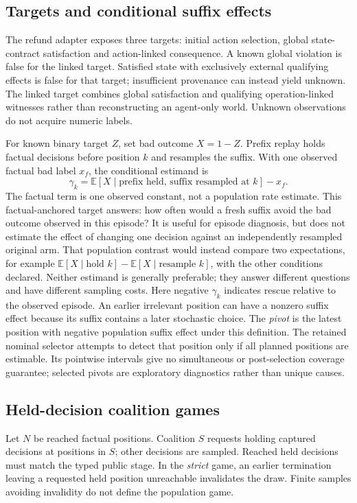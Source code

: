 \documentclass[conference]{IEEEtran}
\begin{document}
\subsection{Targets and conditional suffix effects}
The refund adapter exposes three targets: initial action selection, global
state-contract satisfaction and action-linked consequence. A known global
violation is false for the linked target. Satisfied state with exclusively
external qualifying effects is false for that target; insufficient provenance
can instead yield unknown. The linked target combines global satisfaction and
qualifying operation-linked witnesses rather than reconstructing an agent-only
world. Unknown observations do not acquire numeric labels.

For known binary target $Z$, set bad outcome $X=1-Z$. Prefix replay holds
factual decisions before position $k$ and resamples the suffix. With one
observed factual bad label $x_f$, the conditional estimand is
\begin{equation}
\gamma_k = \mathbb{E}[X\mid \text{prefix held, suffix resampled at }k]-x_f.
\end{equation}
The factual term is one observed constant, not a population rate estimate.
This factual-anchored target answers: how often would a fresh suffix avoid the
bad outcome observed in this episode? It is useful for episode diagnosis, but
does not estimate the effect of changing one decision against an independently
resampled original arm. That population contrast would instead compare two
expectations, for example $\mathbb{E}[X\mid\text{hold }k]-
\mathbb{E}[X\mid\text{resample }k]$, with the other conditions declared.
Neither estimand is generally preferable; they answer different questions and
have different sampling costs. Here negative $\gamma_k$ indicates rescue
relative to the observed episode. An earlier irrelevant position can have a
nonzero suffix effect because its suffix contains a later stochastic choice.
The \emph{pivot} is the latest position with negative population suffix effect
under this definition. The retained nominal selector attempts to detect that
position only if all planned positions are estimable. Its pointwise intervals
give no simultaneous or post-selection coverage guarantee; selected pivots are
exploratory diagnostics rather than unique causes.

\subsection{Held-decision coalition games}
Let $N$ be reached factual positions. Coalition $S$ requests holding captured
decisions at positions in $S$; other decisions are sampled. Reached held
decisions must match the typed public stage. In the \emph{strict} game, an
earlier termination leaving a requested held position unreachable invalidates
the draw. Finite samples avoiding invalidity do not define the population game.
\end{document}
